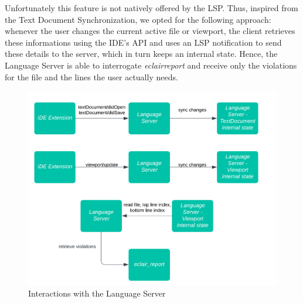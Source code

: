 Unfortunately this feature is not natively offered by the LSP. Thus, inspired from the Text Document Synchronization, we opted for the following approach: whenever the user changes the current active file or viewport, the client retrieves these informations using the IDE's API and uses an LSP notification to send these details to the server, which in turn keeps an internal state. Hence, the Language Server is able to interrogate \emph{eclair\textunderscore	report} and receive only the violations for the file and the lines the user actually needs.

\begin{figure}[ht]
	\centering
	\includegraphics[width=1\textwidth]{Immagini/language_server_flow.jpg}
	\caption{Interactions with the Language Server}
	\label{fig:one}
\end{figure}

